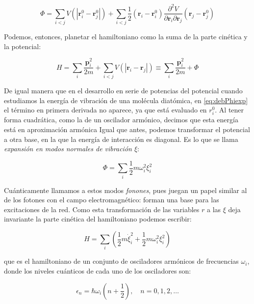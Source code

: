 \documentclass[11pt, a4paper]{article} %
\theoremstyle{named}
\begin{document}
            \begin{equation}\label{eq:debPhiexp}
                \Phi=\sum_{i<j} V\left(\left|\mathbf{r}_{i}^{0}-\mathbf{r}_{j}^{0}\right|\right)+\sum_{i<j} \frac{1}{2}\left(\mathbf{r}_{i}-\mathbf{r}_{i}^{0}\right) \frac{\partial^{2} V}{\partial \mathbf{r}_{i} \partial \mathbf{r}_{j}}\left(\mathbf{r}_{j}-\mathbf{r}_{j}^{0}\right)
            \end{equation}

            Podemos, entonces, planetar el hamiltoniano como la suma de la parte cinética y la potencial:

            $$
            H=\sum_{i} \frac{\mathbf{p}_{i}^{2}}{2 m}+\sum_{i<j} V\left(\left|\mathbf{r}_{i}-\mathbf{r}_{j}\right|\right) \equiv \sum_{i} \frac{\mathbf{p}_{i}^{2}}{2 m}+\Phi
            $$

            De igual manera que en el desarrollo en serie de potencias del potencial cuando estudiamos la energía de vibración de una molécula diatómica, en \eqref{eq:debPhiexp} el término en primera derivada no aparece, ya que está evaluado en $r_i^0$. Al tener forma cuadrática, como la de un oscilador armónico, decimos que esta energía está en aproximación armónica Igual que antes, podemos transformar el potencial a otra base, en la que la energía de interacción es diagonal. Es lo que se llama \textit{expansión en modos normales de vibración $\xi$}:

            $$
            \Phi=\sum_{i} \frac{1}{2} m \omega_{i}^{2} \xi_{i}^{2}
            $$

            Cuánticamente llamamos a estos modos \textit{fonones}, pues juegan un papel similar al de los fotones con el campo electromagnético: forman una base para las excitaciones de la red. Como esta transformación de las variables $r$ a las $\xi$ deja invariante la parte cinética del hamiltoniano podemos escribir:

            \begin{equation}\label{eq:debHmode}
                H=\sum_{i}\left(\frac{1}{2} m \dot{\xi}_{i}^{2}+\frac{1}{2} m \omega_{i}^{2} \xi_{i}^{2}\right)
            \end{equation}

            que es el hamiltoniano de un conjunto de osciladores armónicos de frecuencias $\omega_i$, donde los niveles cuánticos de cada uno de los osciladores son:

            $$
            \epsilon_n = \hbar \omega_{i}\left(n+\frac{1}{2}\right),\quad n=0,1,2, \ldots
            $$
\end{document}
